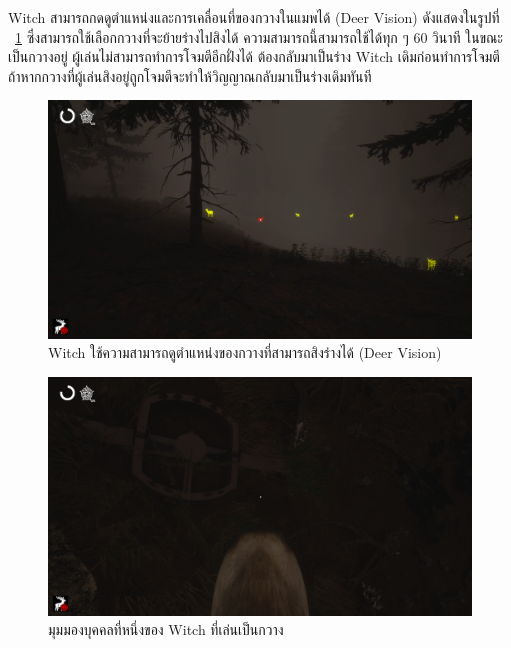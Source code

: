 Witch สามารถกดดูตำแหน่งและการเคลื่อนที่ของกวางในแมพได้ (Deer Vision) ดังแสดงในรูปที่ ~\ref{fig:deer_vision} ซึ่งสามารถใช้เลือกกวางที่จะย้ายร่างไปสิงได้
ความสามารถนี้สามารถใช้ได้ทุก ๆ 60 วินาที ในขณะเป็นกวางอยู่ ผู้เล่นไม่สามารถทำการโจมตีอีกฝั่งได้
ต้องกลับมาเป็นร่าง Witch เดิมก่อนทำการโจมตี ถ้าหากกวางที่ผู้เล่นสิงอยู่ถูกโจมตีจะทำให้วิญญาณกลับมาเป็นร่างเดิมทันที

\begin{figure}[p]
  \begin{center}
  \includegraphics[width=\textwidth]{./img/mechanics/deervision.png}
  \end{center}
    \caption[Witch ใช้ความสามารถดูตำแหน่งของกวางที่สามารถสิงร่างได้ (Deer Vision)]{Witch ใช้ความสามารถดูตำแหน่งของกวางที่สามารถสิงร่างได้ (Deer Vision)}
    \label{fig:deer_vision}
\end{figure}

\begin{figure}[p]
  \begin{center}
  \includegraphics[width=\textwidth]{./img/mechanics/witch_deer.png}
  \end{center}
    \caption[มุมมองบุคคลที่หนึ่งของ Witch ที่เล่นเป็นกวาง]{มุมมองบุคคลที่หนึ่งของ Witch ที่เล่นเป็นกวาง}
    \label{fig:deer_view}
\end{figure}

